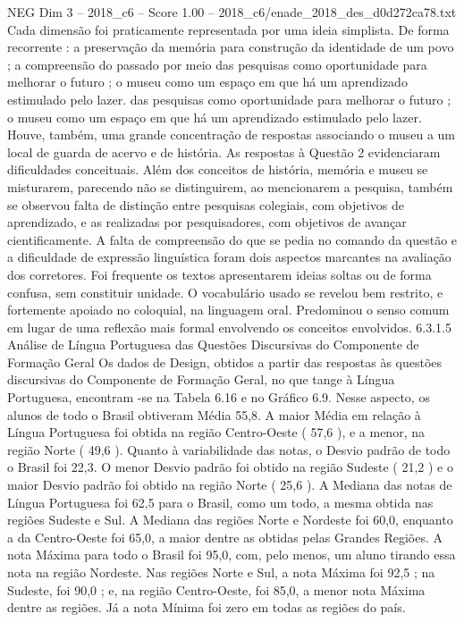 \begin{textsample}{NEG Dim 3 – 2018\_c6 – Score 1.00 – 2018\_c6/enade\_2018\_des\_d0d272ca78.txt}
Cada dimensão foi praticamente representada por uma ideia simplista.
De forma recorrente : a preservação da memória para construção da identidade de um povo ; a compreensão do passado por meio das pesquisas como oportunidade para melhorar o futuro ; o museu como um espaço em que há um aprendizado estimulado pelo lazer. das pesquisas como oportunidade para melhorar o futuro ; o museu como um espaço em que há um aprendizado estimulado pelo lazer.
Houve, também, uma grande concentração de respostas associando o museu a um local de guarda de acervo e de história.
As respostas à Questão 2 evidenciaram dificuldades conceituais.
Além dos conceitos de história, memória e museu se misturarem, parecendo não se distinguirem, ao mencionarem a pesquisa, também se observou falta de distinção entre pesquisas colegiais, com objetivos de aprendizado, e as realizadas por pesquisadores, com objetivos de avançar cientificamente.
A falta de compreensão do que se pedia no comando da questão e a dificuldade de expressão linguística foram dois aspectos marcantes na avaliação dos corretores.
Foi frequente os textos apresentarem ideias soltas ou de forma confusa, sem constituir unidade.
O vocabulário usado se revelou bem restrito, e fortemente apoiado no coloquial, na linguagem oral.
Predominou o senso comum em lugar de uma reflexão mais formal envolvendo os conceitos envolvidos. 6.3.1.5 Análise de Língua Portuguesa das Questões Discursivas do Componente de Formação Geral Os dados de Design, obtidos a partir das respostas às questões discursivas do Componente de Formação Geral, no que tange à Língua Portuguesa, encontram -se na Tabela 6.16 e no Gráfico 6.9.
Nesse aspecto, os alunos de todo o Brasil obtiveram Média 55,8.
A maior Média em relação à Língua Portuguesa foi obtida na região Centro-Oeste ( 57,6 ), e a menor, na região Norte ( 49,6 ).
Quanto à variabilidade das notas, o Desvio padrão de todo o Brasil foi 22,3.
O menor Desvio padrão foi obtido na região Sudeste ( 21,2 ) e o maior Desvio padrão foi obtido na região Norte ( 25,6 ).
A Mediana das notas de Língua Portuguesa foi 62,5 para o Brasil, como um todo, a mesma obtida nas regiões Sudeste e Sul.
A Mediana das regiões Norte e Nordeste foi 60,0, enquanto a da Centro-Oeste foi 65,0, a maior dentre as obtidas pelas Grandes Regiões.
A nota Máxima para todo o Brasil foi 95,0, com, pelo menos, um aluno tirando essa nota na região Nordeste.
Nas regiões Norte e Sul, a nota Máxima foi 92,5 ; na Sudeste, foi 90,0 ; e, na região Centro-Oeste, foi 85,0, a menor nota Máxima dentre as regiões.
Já a nota Mínima foi zero em todas as regiões do país.

\end{textsample}
